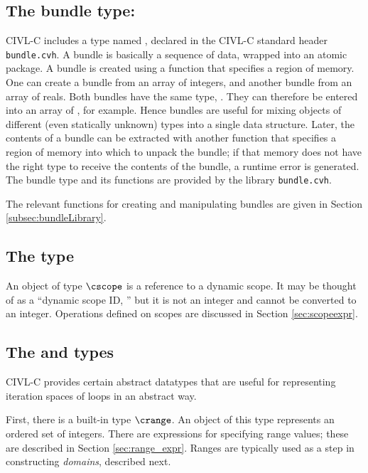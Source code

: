\subsection{The bundle type: \cbundle}
\label{subsec:bundleType}

CIVL-C includes a type named \cbundle, declared in the CIVL-C standard header \texttt{bundle.cvh}. A bundle is basically a
sequence of data, wrapped into an atomic package. A bundle is created
using a function that specifies a region of memory. One can create a
bundle from an array of integers, and another bundle from an array of
reals. Both bundles have the same type, \cbundle. They can therefore
be entered into an array of \cbundle, for example. Hence bundles are
useful for mixing objects of different (even statically unknown) types
into a single data structure. Later, the contents of a bundle can be
extracted with another function that specifies a region of memory into
which to unpack the bundle; if that memory does not have the right
type to receive the contents of the bundle, a runtime error is
generated. The bundle type and its functions are provided by the library \texttt{bundle.cvh}.

The relevant functions for creating and manipulating bundles
are given in Section \ref{subsec:bundleLibrary}.

\subsection{The \cscope{} type}
\label{sec:scopetype}

An object of type $\cscope$ is a reference to a dynamic scope.  It may
be thought of as a ``dynamic scope ID, '' but it is not an integer and
cannot be converted to an integer.  Operations defined on scopes are
discussed in Section \ref{sec:scopeexpr}.

\subsection{The \crange{} and \cdomain{} types}

CIVL-C provides certain abstract datatypes that are useful for
representing iteration spaces of loops in an abstract way.

First, there is a built-in type $\crange$.  An object of this type
represents an ordered set of integers.  There are expressions for
specifying range values; these are described in Section
\ref{sec:range_expr}.   Ranges are typically used as a step
in constructing \emph{domains}, described next.

